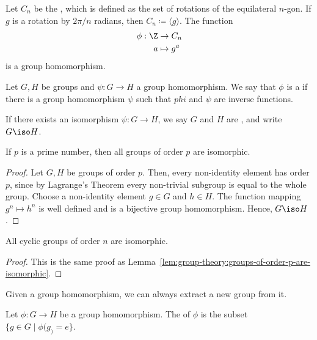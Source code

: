 \documentclass[12pt]{report}
\begin{document}
\begin{example}
  Let \(C_{n}\) be the , which is defined as the set of rotations of the equilateral \(n\)-gon.
  If \(g\) is a rotation by \(2 \pi /n \) radians, then \(C_{n} \coloneqq \langle g \rangle\).
  The function
  \begin{align*}
    \phi : \Z &\to C_{n} \\
    a &\mapsto g^{a}
  \end{align*}
  is a group homomorphism.
\end{example}


\begin{definition}
  \label{def:group-theory:group-isomorphism}
  Let \(G, H\) be groups and \(\psi : G \to H\) a group homomorphism.
  We say that \(\phi\) is a  if there is a group homomorphism \(\psi\) such that \(phi\) and \(\psi\) are inverse functions.

  If there exists an isomorphism \(\psi : G \to H\), we say \(G\) and \(H\) are , and write \(G \iso H\).
\end{definition}

\begin{lemma}
  \label{lem:group-theory:groups-of-order-p-are-isomorphic}
  If \(p\) is a prime number, then all groups of order \(p\) are isomorphic.
\end{lemma}

\begin{proof}
  Let \(G, H\) be groups of order \(p\).
  Then, every non-identity element has order \(p\), since by Lagrange's Theorem every non-trivial subgroup is equal to the whole group.
  Choose a non-identity element \(g \in G\) and \(h \in H\).
  The function mapping \(g^{n} \mapsto h^{n}\) is well defined and is a bijective group homomorphism.
  Hence, \(G \iso H\).
\end{proof}

\begin{lemma}
  All cyclic groups of order \(n\) are isomorphic.
\end{lemma}

\begin{proof}
  This is the same proof as Lemma~\ref{lem:group-theory:groups-of-order-p-are-isomorphic}.
\end{proof}


Given a group homomorphism, we can always extract a new group from it.

\begin{definition}
  Let \(\phi:G \to H\) be a group homomorphism.
  The  of \(\phi\) is the subset \(\{g \in G \mid \phi(g_) = e\}\).
\end{definition}
\end{document}
